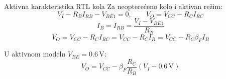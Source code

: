 \begin{frame}[label=10-s014]{Aktivna karakteristika RTL kola}
\setlength{\abovedisplayskip}{4pt}\setlength{\belowdisplayskip}{4pt}\setlength{\abovedisplayshortskip}{3pt}\setlength{\belowdisplayshortskip}{3pt}
Za neopterećeno kolo i aktivan režim:
\[V_I-R_BI_{RB}-V_{BE1}=0,\qquad V_O=V_{CC}-R_CI_{RC}\]
\[I_B=I_{RB}=\frac{V_I-V_{BE1}}{R_B}\]
\[V_O=V_{CC}-R_CI_{RC}=V_{CC}-R_CI_R=V_{CC}-R_C\beta_FI_B\]

\medskip
U aktivnom modelu $V_{BE}=0.6\,\mathrm{V}$:
\[V_O=V_{CC}-\beta_F\frac{R_C}{R_B}(V_I-0.6\,\mathrm{V})\]
\end{frame}
